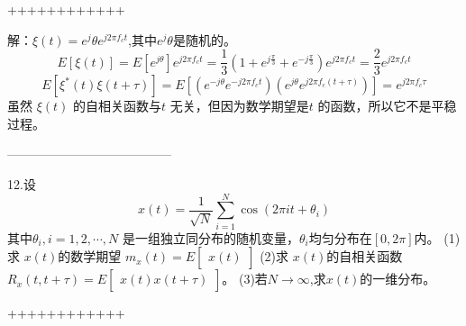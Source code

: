 \documentclass[utf8]{article}
\begin{document}
++++++++++++

解：$\xi(t)=e^j\theta e^{j2\pi f_ct}$,其中$e^j\theta$是随机的。
$$E\left[\xi\left(t\right)\right]=E\left[e^{j\theta}\right]e^{j2\pi f_ct}=\frac13\left(1+e^{j\frac\pi3}+e^{-j\frac\pi3}\right)e^{j2\pi f_ct}=\frac23e^{j2\pi f_ct}$$
$$E\left[\xi^*\left(t\right)\xi\left(t+\tau\right)\right]=E\left[\left(e^{-j\theta}e^{-j2\pi f_ct}\right)\left(e^{j\theta}e^{j2\pi f_c(t+\tau)}\right)\right]=e^{j2\pi f_c\tau}$$
虽然 $\xi(t)$ 的自相关函数与$t$ 无关，但因为数学期望是$t$ 的函数，所以它不是平稳过程。

---------------------------------------

12.设
$$x\left(t\right)=\frac1{\sqrt{N}}\sum_{i=1}^N\cos\left(2\pi it+\theta_i\right)$$
其中$\theta_i,i=1,2,\cdots,N$ 是一组独立同分布的随机变量，$\theta_i$均匀分布在$\left[0,2\pi\right]$内。
(1)求 $x(t)$的数学期望 $m_x(t)=E\begin{bmatrix}x(t)\end{bmatrix}$
(2)求 $x(t)$的自相关函数 $R_x\left(t,t+\tau\right)=E\begin{bmatrix}x(t)x(t+\tau)\end{bmatrix}$。
(3)若$N\to\infty$,求$x(t)$的一维分布。

++++++++++++
\end{document}

